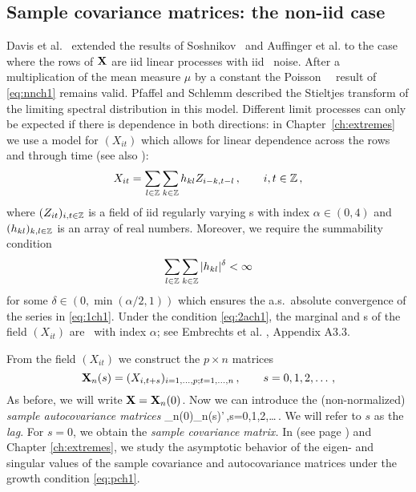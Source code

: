 \subsection{Sample covariance matrices: the non-iid case}

Davis et al.~\cite{davis:pfaffel:stelzer:2014} extended the results of Soshnikov~\cite{soshnikov:2004,soshnikov:2006} and Auffinger et al. \cite{auffinger:arous:peche:2009}
to the case where the rows of ${\mathbf X}$
are iid linear processes with iid \regvary\ noise. After a multiplication of the mean measure $\mu$ by a constant the Poisson \pp\ \con\ result of \eqref{eq:nnch1} remains valid. Pfaffel and Schlemm \cite{pfaffel:schlemm:2011} described the Stieltjes transform of the limiting spectral distribution in this model.
Different limit processes can only be expected if there is dependence in both directions:
in Chapter~\ref{ch:extremes} we use a model for $(X_{it})$ which allows for linear dependence across the rows and through time (see also \cite{davis:mikosch:pfaffel:2015}): 
\begin{equation}\label{eq:1ch1}
X_{it}=\sum_{l\in \mathbb{Z}}\sum_{k\in \mathbb{Z}} h_{kl} Z_{i-k,t-l}\,,\qquad i,t\in\mathbb{Z}\,,
\end{equation}
where $(Z_{it})_{i,t\in \mathbb{Z}}$ is a field of iid regularly varying \rv s with index $\alpha\in (0,4)$ and $(h_{kl})_{k,l\in\mathbb{Z}}$ is an array of real numbers. Moreover, we require the summability condition
\begin{equation}\label{eq:2ach1}
\sum_{l \in \mathbb{Z}} \sum_{k\in \mathbb{Z}} |h_{kl}|^{\delta} <\infty
\end{equation}
for some $\delta\in (0,\min({\alpha/2},1))$ which ensures
the a.s.~absolute convergence of the series in \eqref{eq:1ch1}. Under the condition \eqref{eq:2ach1}, the marginal and
\fidi s of the field $(X_{it})$ are \regvary\ with index $\alpha$; see
Embrechts et al. \cite{embrechts:kluppelberg:mikosch:1997}, Appendix A3.3.

From the field $(X_{it})$ we construct the $p\times n$ matrices
\begin{equation*}
{\mathbf X}_n(s)= (X_{i,t+s})_{i=1,\ldots,p;t=1,\ldots,n}\,,\qquad s=0,1,2,\ldots\,,
\end{equation*}
As before, we will write ${\mathbf X}={\mathbf X}_n(0)$.
Now we can introduce the (non-normalized)
{\em sample autocovariance matrices}
\beao%
\X_n(0)\X_n(s)'\,,\qquad s=0,1,2,\ldots\,.
\eeao
We will refer to $s$ as the {\em lag}. For $s=0$, we obtain the {\em sample covariance matrix.}
In \cite{heiny:mikosch:2016:noniid1} (see page \pageref{eq:regvarch1}) and Chapter \ref{ch:extremes}, we study the asymptotic behavior of the eigen- and singular values of the
sample covariance and autocovariance matrices under the growth condition \eqref{eq:pch1}.

